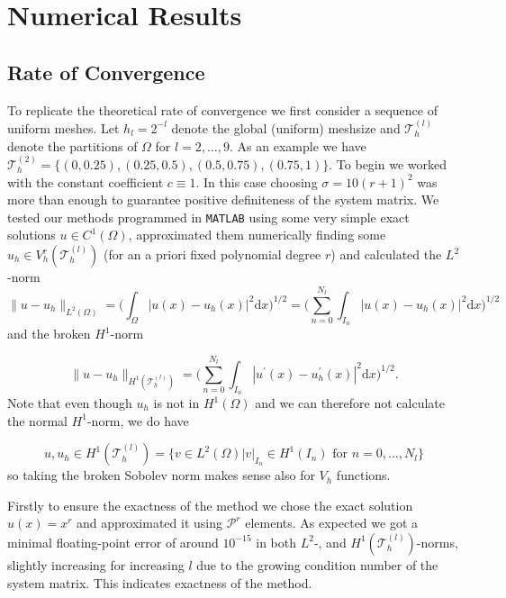 \section{Numerical Results}
\subsection{Rate of Convergence}
To replicate the theoretical rate of convergence we first consider a sequence of uniform meshes. 
Let $h_l = 2^{-l}$ denote the global (uniform) meshsize and $\mathcal{T}_h^{(l)}$ denote
the partitions of $\Omega$ for $l = 2,\ldots,9$. As an example we have $\mathcal{T}_h^{(2)} = \{(0, 0.25), (0.25, 0.5),(0.5, 0.75),(0.75, 1)\}$. 
To begin we worked with the constant coefficient $c\equiv 1$. In this case choosing $\sigma = 10(r+1)^2$ was more than enough to guarantee positive definiteness of the 
system matrix.
We tested our methods programmed in \texttt{MATLAB} using some very simple exact solutions $u \in C^1(\Omega)$, approximated them numerically finding some $u_h \in V_h^r(\mathcal{T}_h^{(l)})$ 
(for an a priori fixed polynomial degree $r$) and calculated the $L^2$-norm
\begin{equation}
	\|u - u_h\|_{L^2(\Omega)} = \Big( \int_{\Omega} |u(x) - u_h(x)|^2 \text{d} x \Big)^{1/2} = \Big( \sum_{n=0}^{N_l}\int_{I_n} |u(x) - u_h(x)|^2 \text{d} x \Big)^{1/2} \nonumber
\end{equation}
and the broken $H^1$-norm

\begin{equation}
	\|u - u_h\|_{H^1(\mathcal{T}_h^{(l)} )} = \Big( \sum_{n=0}^{N_l}\int_{I_n} |u^{\prime}(x) - u_h^{\prime}(x)|^2 \text{d} x \Big)^{1/2}. \nonumber
\end{equation}
Note that even though $u_h$ is not in $H^1(\Omega)$ and we can therefore not calculate the normal $H^1$-norm, we do have 

\begin{equation}
	u, u_h \in H^1(\mathcal{T}_h^{(l)}) = \{v \in L^2(\Omega) | v|_{I_n} \in  H^1(I_n) \text{ for } n = 0,\ldots,N_l\} \nonumber
\end{equation}
so taking the broken Sobolev norm makes sense also for $V_h$ functions.

Firstly to ensure the exactness of the method we chose
the exact solution $u(x) = x^r$ and approximated it using $\mathcal{P}^r$ elements. As expected we got a minimal floating-point error of around $10^{-15}$
in both $L^2$-, and $H^1(\mathcal{T}^{(l)}_h)$-norms, slightly increasing for increasing $l$ due to the growing condition number of the system matrix.
This indicates exactness of the method.

